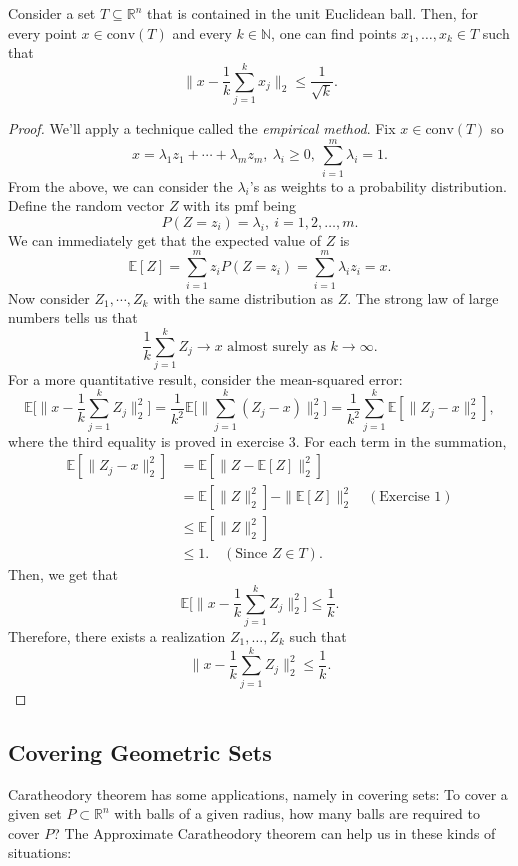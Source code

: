 \begin{theorem}
\label{thm:0.0.4}
Consider a set $T \subseteq \mathbb{R}^n$ that is contained in the unit Euclidean ball. Then, for every point 
$x \in \text{conv}(T)$ and every $k \in \mathbb{N}$, one can find points $x_1, \dots, x_k \in T$ such that 
\[ \bigg\| x - \frac{1}{k} \sum_{j = 1}^{k} x_j \bigg\|_2 \leq \frac{1}{\sqrt{k}}. \]
\end{theorem}

\begin{proof}
We'll apply a technique called the \textit{empirical method}. Fix $x \in \text{conv}(T)$ so 
\[ x = \lambda_1 z_1 + \cdots + \lambda_m z_m, \ \lambda_i \geq 0, \ \sum_{i = 1}^{m} \lambda_i = 1. \]
From the above, we can consider the $\lambda_i$'s as weights to a probability distribution. Define the random 
vector $Z$ with its pmf being 
\[ P(Z = z_i) = \lambda_i, \ i = 1, 2, \dots, m. \]
We can immediately get that the expected value of $Z$ is 
\[ \mathbb{E}[Z] = \sum_{i = 1}^{m} z_i P(Z = z_i) = \sum_{i = 1}^{m} \lambda_i z_i = x. \]
Now consider $Z_1, \cdots, Z_k$ with the same distribution as $Z$. The strong law of large numbers tells us that 
\[ \frac{1}{k}\sum_{j = 1}^{k} Z_j \to x \text{  almost surely as  } k \to \infty. \]
For a more quantitative result, consider the mean-squared error:
\[ \mathbb{E}\biggl[ \bigg\| x - \frac{1}{k}\sum_{j = 1}^{k}Z_j \bigg\|_2^2 \biggr] 
= \frac{1}{k^2} \mathbb{E}\biggl[ \bigg\| \sum_{j = 1}^{k} (Z_j - x) \bigg\|_2^2 \biggr] 
= \frac{1}{k^2} \sum_{j = 1}^{k} \mathbb{E}[\| Z_j - x \|_2^2], \]
where the third equality is proved in exercise 3. For each term in the summation, 
\begin{align*}
	\mathbb{E}[\|Z_j - x\|_2^2] 
	&= \mathbb{E}[\|Z - \mathbb{E}[Z]\|_2^2] \\
	&= \mathbb{E}[\|Z\|_2^2] - \|\mathbb{E}[Z]\|_2^2 \quad (\text{Exercise 1}) \\
	&\leq \mathbb{E}[\|Z\|_2^2] \\
	&\leq 1. \quad (\text{Since } Z \in T).
\end{align*}
Then, we get that 
\[ \mathbb{E}\biggl[ \bigg\| x - \frac{1}{k}\sum_{j = 1}^{k}Z_j \bigg\|_2^2 \biggr] \leq \frac{1}{k}. \]
Therefore, there exists a realization $Z_1, \dots, Z_k$ such that 
\[ \bigg\| x - \frac{1}{k}\sum_{j = 1}^{k}Z_j \bigg\|_2^2 \leq \frac{1}{k}. \]
\end{proof}


\subsection{Covering Geometric Sets}
Caratheodory theorem has some applications, namely in covering sets: To cover a given set $P \subset 
\mathbb{R}^n$ with balls of a given radius, how many balls are required to cover $P$? The Approximate 
Caratheodory theorem can help us in these kinds of situations: 

